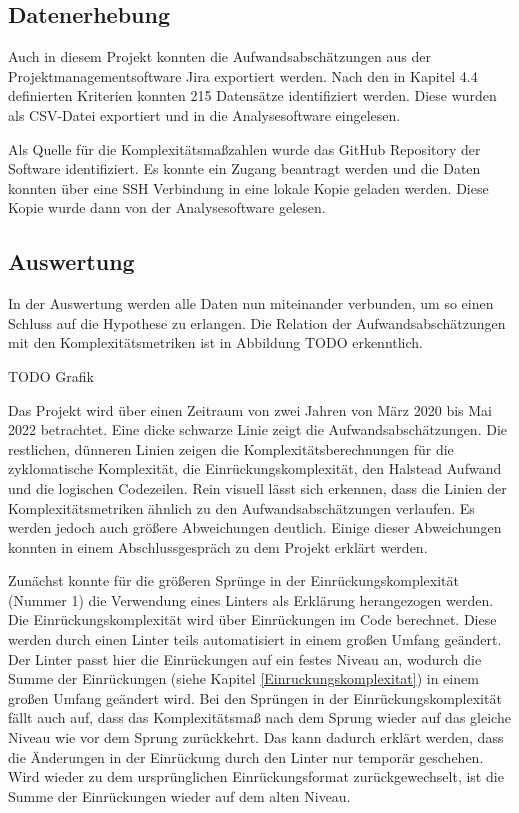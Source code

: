 \subsection{Datenerhebung}\label{Alstonii-Datenerhebung}

Auch in diesem Projekt konnten die Aufwandsabschätzungen aus der
Projektmanagementsoftware Jira exportiert werden. Nach den in Kapitel
4.4 definierten Kriterien konnten 215 Datensätze identifiziert werden.
Diese wurden als CSV-Datei exportiert und in die Analysesoftware
eingelesen.

Als Quelle für die Komplexitätsmaßzahlen wurde das GitHub Repository der
Software identifiziert. Es konnte ein Zugang beantragt werden und die
Daten konnten über eine SSH Verbindung in eine lokale Kopie geladen
werden. Diese Kopie wurde dann von der Analysesoftware gelesen.

\subsection{Auswertung}\label{Alstonii-Auswertung}

In der Auswertung werden alle Daten nun miteinander verbunden, um so
einen Schluss auf die Hypothese zu erlangen. Die Relation der
Aufwandsabschätzungen mit den Komplexitätsmetriken ist in Abbildung TODO
erkenntlich.

TODO Grafik

Das Projekt wird über einen Zeitraum von zwei Jahren von März 2020 bis
Mai 2022 betrachtet. Eine dicke schwarze Linie zeigt die
Aufwandsabschätzungen. Die restlichen, dünneren Linien zeigen die
Komplexitätsberechnungen für die zyklomatische Komplexität, die
Einrückungskomplexität, den Halstead Aufwand und die logischen
Codezeilen. Rein visuell lässt sich erkennen, dass die Linien der
Komplexitätsmetriken ähnlich zu den Aufwandsabschätzungen verlaufen. Es
werden jedoch auch größere Abweichungen deutlich. Einige dieser
Abweichungen konnten in einem Abschlussgespräch zu dem Projekt erklärt
werden.

Zunächst konnte für die größeren Sprünge in der Einrückungskomplexität
(Nummer 1) die Verwendung eines Linters als Erklärung herangezogen
werden. Die Einrückungskomplexität wird über Einrückungen im Code
berechnet. Diese werden durch einen Linter teils automatisiert in einem
großen Umfang geändert. Der Linter passt hier die Einrückungen auf ein
festes Niveau an, wodurch die Summe der Einrückungen (siehe Kapitel \ref{Einruckungskomplexitat}) in
einem großen Umfang geändert wird. Bei den Sprüngen in der
Einrückungskomplexität fällt auch auf, dass das Komplexitätsmaß nach dem
Sprung wieder auf das gleiche Niveau wie vor dem Sprung zurückkehrt. Das
kann dadurch erklärt werden, dass die Änderungen in der Einrückung durch
den Linter nur temporär geschehen. Wird wieder zu dem ursprünglichen
Einrückungsformat zurückgewechselt, ist die Summe der Einrückungen
wieder auf dem alten Niveau.

